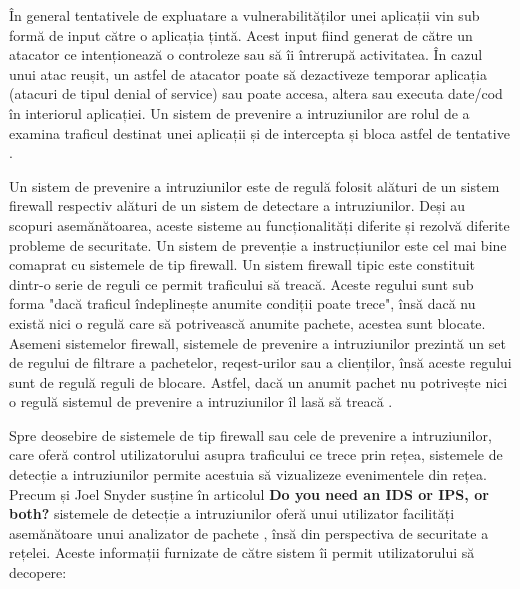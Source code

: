 În general tentativele de expluatare a vulnerabilităților unei aplicații vin sub formă de input către o aplicația țintă. Acest input fiind generat de către un atacator ce intenționează o controleze sau să îi întrerupă activitatea. În cazul unui atac reușit, un astfel de atacator poate să dezactiveze temporar aplicația (atacuri de tipul denial of service) sau poate accesa, altera sau executa date/cod în interiorul aplicației. Un sistem de prevenire a intruziunilor are rolul de a examina traficul destinat unei aplicații și de intercepta și bloca astfel de tentative  \cite{what_is_ips}.

Un sistem de prevenire a intruziunilor este de regulă folosit alături de un sistem firewall respectiv alături de un sistem de detectare a intruziunilor. Deși au scopuri asemănătoarea, aceste sisteme au funcționalități diferite și rezolvă diferite probleme de securitate. Un sistem de prevenție a instrucțiunilor este cel mai bine comaprat cu sistemele de tip firewall. Un sistem firewall tipic este constituit dintr-o serie de reguli ce permit traficului să treacă. Aceste regului sunt sub forma "dacă traficul îndeplinește anumite condiții poate trece", însă dacă nu există nici o regulă care să potrivească anumite pachete, acestea sunt blocate. Asemeni sistemelor firewall, sistemele de prevenire a intruziunilor prezintă un set de regului de filtrare a pachetelor, reqest-urilor  sau a clienților, însă aceste regului sunt de regulă reguli de blocare. Astfel, dacă un anumit pachet nu potrivește nici o regulă sistemul de prevenire a intruziunilor îl lasă să treacă  \cite{ips_ids}.

Spre deosebire de sistemele de tip firewall sau cele de prevenire a intruziunilor, care oferă control utilizatorului asupra traficului ce trece prin rețea, sistemele de detecție a intruziunilor permite acestuia să vizualizeze evenimentele din rețea. Precum și Joel Snyder susține în articolul  \textbf{Do you need an IDS or IPS, or both?} \cite{ips_ids}  sistemele  de detecție a intruziunilor oferă unui utilizator facilități asemănătoare unui analizator de pachete  \cite{net_an},  însă din perspectiva de securitate a rețelei. Aceste informații furnizate de către sistem îi permit utilizatorului să decopere:  
 
